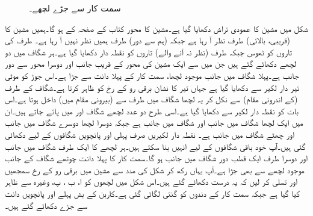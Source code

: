 \begin{figure}
\caption{سمت کار سے جڑے لچھے۔}
\label{شکل_یکسمتی_سمتکار_سے_جڑے_لچھے}
\end{figure}


شکل  میں مشین کا عمودی تراش دکھایا گیا ہے۔مشین کا محور کتاب کے صفحہ کے   ہو گا۔ہمیں مشین کا (قریبی، بالائی)    طرف نظر آ رہا ہے جبکہ  (ہم سے دور)   طرف ہمیں نظر نہیں آ رہا ہے۔ طرف کی تاروں کو ٹھوس جبکہ  طرف (نظر نہ آنے والے) تاروں کو نقطہ دار دکھایا گیا ہے۔ہر شگاف میں دو لچھے دکھائے گئے ہیں جن میں سے ایک مشین کی محور کے قریب   جانب اور دوسرا محور سے دور  جانب ہے۔پہلا  شگاف میں  جانب موجود لچھا، سمت کار کے پہلا  دانت سے جڑا ہے۔اس جوڑ کو موٹی تیر دار لکیر سے دکھایا گیا ہے جہاں تیر کا نشان برقی رو کے رخ کو ظاہر کرتا ہے۔شگاف  کے  طرف (کے اندرونی مقام) سے نکل کر یہ لچھا  شگاف  میں  طرف سے (بیرونی مقام میں) داخل ہوتا ہے۔اس بات کو نقطہ دار لکیر سے دکھایا گیا ہے۔اسی طرح دو عدد لچھے شگاف  اور  میں پائے جاتے ہیں۔ان میں ایک لچھا  شگاف   میں  جانب اور شگاف  میں  جانب ہے جبکہ دوسرا لچھا دوسرے شگاف میں   جانب اور چھٹے شگاف میں  جانب ہے۔ نقطہ دار لکیریں صرف پہلی اور پانچویں شگافوں کے لیے دکھائی گئی ہیں۔آپ خود باقی شگافوں کے لیے انہیں بنا سکتے ہیں۔ہر لچھے کا ایک طرف شگاف میں  جانب  اور  دوسرا طرف ایک قطب دور  شگاف میں  جانب  ہو گا۔سمت کار کا  پہلا  دانت چوتھے  شگاف کے  جانب موجود لچھے سے بھی جڑا ہے۔آپ یہاں رکھ کر شکل   کی مدد سے مشین میں برقی رو کے رخ سمجھیں اور تسلی کر لیں کہ یہ درست دکھائے گئے ہیں۔اس شکل میں لچھوں کو ا، ب ، پ، وغیرہ سے ظاہر کیا گیا ہے جبکہ سمت کار کے دندوں کو گنتی لگائی گئی ہے۔کاربن کے بش پہلے اور پانچویں دانت سے جڑے دکھائے گئے ہیں۔


